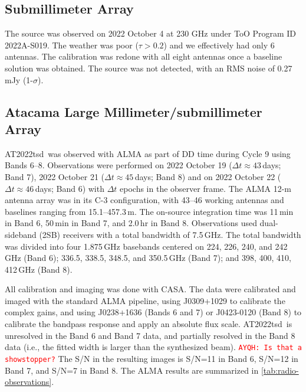 \documentclass{nature_plusfigure}
\newcommand{\at}{AT2022tsd}
\newcommand{\ayqh}[1]{{\textcolor{red}{\texttt{AYQH: #1}}}}
\begin{document}
\begin{methods}

\subsection{Submillimeter Array}
\label{Methods:SMA}

The source was observed on 2022 October 4 at 230 GHz under ToO Program ID 2022A-S019.
The weather was poor ($\tau > 0.2$) and we effectively had only 6 antennas. The calibration was redone with all eight antennas once a baseline solution was obtained. The source was not detected, with an RMS noise of 0.27\,mJy (1-$\sigma$).

\subsection{Atacama Large Millimeter/submillimeter Array}
\label{sec:ALMA}

\at\ was observed with ALMA as part of DD time during Cycle 9 using Bands 6--8. Observations were performed on 2022 October 19 ($\Delta t \approx 43$\,days; Band 7), 2022 October 21 ($\Delta t \approx 45$\,days; Band 8) and on 2022 October 22 ($\Delta t \approx 46$\,days; Band 6) with $\Delta t$ epochs in the observer frame. The ALMA 12-m antenna array was in its C-3 configuration, with
43--46 working antennas and baselines ranging from 15.1--457.3\,m. The on-source integration time was
11\,min in Band 6, 50\,min in Band 7, and 2.0\,hr in Band 8.
Observations used dual-sideband (2SB) receivers with a total bandwidth of 7.5\,GHz. The total bandwidth was divided into four 1.875\,GHz basebands centered on 224, 226, 240, and 242\,GHz (Band 6);
336.5, 338.5, 348.5, and 350.5\,GHz (Band 7);
and 398, 400, 410, 412\,GHz (Band 8).


All calibration and imaging was done with CASA.
The data were calibrated and imaged
with the standard ALMA pipeline, using J0309+1029 to calibrate the complex gains, and using J0238+1636 (Bands 6 and 7) or J0423-0120 (Band 8) to calibrate the bandpass response and apply an absolute flux scale.
\at\ is unresolved in the Band 6 and Band 7 data, and partially resolved in the Band 8 data (i.e., the fitted width is larger than the synthesized beam). \ayqh{Is that a showstopper?}
The S/N in the resulting images is S/N=11 in Band 6, S/N=12 in Band 7, and S/N=7 in Band 8.
The ALMA results are summarized in \ref{tab:radio-observations}.


\end{methods}
\end{document}
